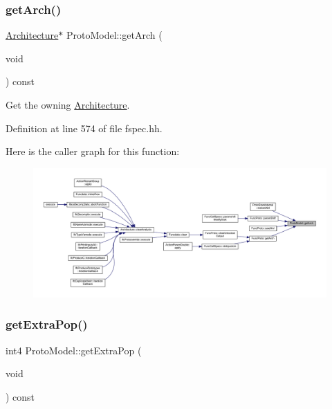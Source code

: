 \subsubsection{\texorpdfstring{getArch()}{getArch()}}
{\footnotesize\ttfamily \mbox{\hyperlink{class_architecture}{Architecture}}$\ast$ Proto\+Model\+::get\+Arch (\begin{DoxyParamCaption}\item[{void}]{ }\end{DoxyParamCaption}) const\hspace{0.3cm}{\ttfamily [inline]}}



Get the owning \mbox{\hyperlink{class_architecture}{Architecture}}. 



Definition at line 574 of file fspec.\+hh.

Here is the caller graph for this function\+:
\nopagebreak
\begin{figure}[H]
\begin{center}
\leavevmode
\includegraphics[width=350pt]{class_proto_model_a256b9f054603fd6d166fdf86689467bf_icgraph}
\end{center}
\end{figure}
\mbox{\label{class_proto_model_a640ae87320b6d6781639643057e61e1d}} 
\subsubsection{\texorpdfstring{getExtraPop()}{getExtraPop()}}
{\footnotesize\ttfamily int4 Proto\+Model\+::get\+Extra\+Pop (\begin{DoxyParamCaption}\item[{void}]{ }\end{DoxyParamCaption}) const\hspace{0.3cm}{\ttfamily [inline]}}



